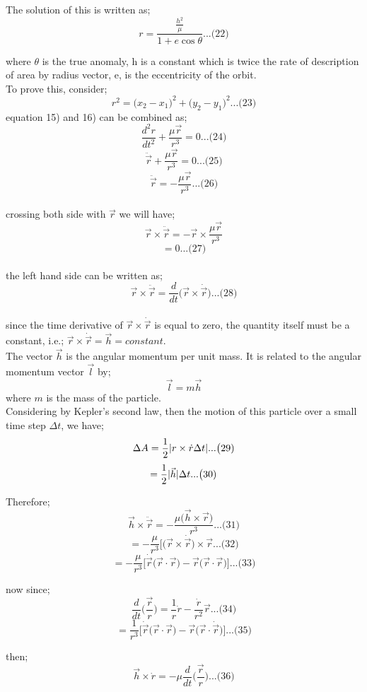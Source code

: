 The solution of this is written as;
\[r = \frac{\frac{h^2}{\mu}}{1+e\cos\theta} ... \big(22)\]

where \(\theta\) is the true anomaly, h is a constant which is twice the rate of description of area by radius vector, e, is the eccentricity of the orbit.\\

To prove this, consider; 
\[r^2 = \big(x_2-x_1)^2+\big(y_2-y_1)^2 ... \big(23)\]
equation 15) and 16) can be combined as; 
\[\frac{d^2r}{dt^2}+\frac{\mu\vec{r}}{r^3}=0 ... \big(24)\]
\[\ddot{\vec{r}}+\frac{\mu\vec{r}}{r^3}=0 ... \big(25)\]
\[\ddot{\vec{r}}=-\frac{\mu\vec{r}}{r^3} ... \big(26)\]\\
crossing both side with \(\vec{r}\) we will have;
\[\vec{r}\times\ddot{\vec{r}}=-\vec{r}\times\frac{\mu\vec{r}}{r^3}\]
\[=0 ... \big(27)\]\\
the left hand side can be written as;
\[\vec{r}\times\ddot{\vec{r}}= \frac{d}{dt}\big(\vec{r}\times\dot{\vec{r}}) ... \big(28)\]\\
since the time derivative of \(\vec{r}\times\dot{\vec{r}}\) is equal to zero, the quantity itself must be a constant, i.e.; \(\vec{r}\times\dot{\vec{r}}=\vec{h}=constant\).\\
The vector \(\vec{h}\) is the angular momentum per unit mass. It is related to the angular momentum vector \(\vec{l}\) by;
\[\vec{l}= m\vec{h}\]
where \(m\) is the mass of the particle.\\

Considering by Kepler's second law, then the motion of this particle over a small time step \(\Delta t\), we have;
\[\Delta A = \frac{1}{2}\arrowvert r\times \dot{r}\Delta t\arrowvert ... \big(29)\]
\[=\frac{1}{2}\arrowvert\vec{h}\arrowvert\Delta t ... \big(30)\]

Therefore;
\[\vec{h}\times\ddot{\vec{r}}=-\frac{\mu\big(\vec{h}\times\vec{r})}{r^3}  ... \big(31)\]
\[=-\frac{\mu}{r^3}\big[\big(\vec{r}\times\dot{\vec{r}})\times\vec{r}  ... \big(32)\]
\[=-\frac{\mu}{r^3}\big[\dot{\vec{r}}\big(\vec{r}\cdot\vec{r})-\vec{r}\big(\vec{r}\cdot\vec{r})]  ... \big(33)\]

now since;
\[\frac{d}{dt}\bigg(\frac{\vec{r}}{r}\bigg)=\frac{1}{r}\dot{r}-\frac{\dot{r}}{r^2}\vec{r}  ... \big(34)\]
\[=\frac{1}{r^3}\big[\dot{\vec{r}}\big(\vec{r}\cdot\vec{r})-\vec{r}\big(\vec{r}\cdot\dot{\vec{r}})]  ... \big(35)\] 

then;
\[\vec{h}\times\dot{r}=-\mu\frac{d}{dt}\bigg(\frac{\vec{r}}{r}\bigg)  ... \big(36)\]

